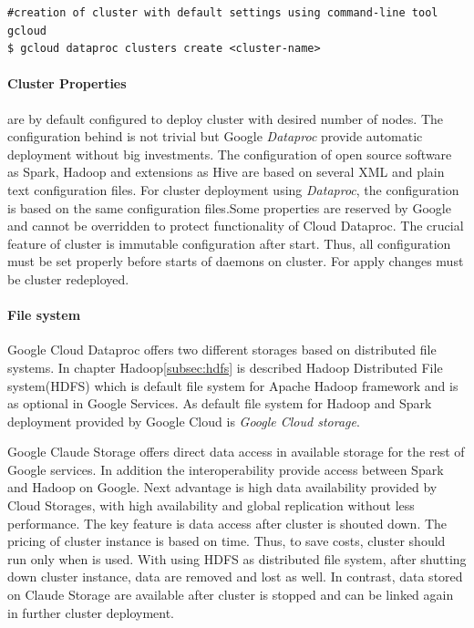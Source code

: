 \documentclass[a4paper,12pt,oneside]{report}
\begin{document}
\begin{footnotesize}\begin{lstlisting}[style=mybash]
#creation of cluster with default settings using command-line tool gcloud
$ gcloud dataproc clusters create <cluster-name>
\end{lstlisting}\end{footnotesize}
 

\paragraph{Cluster Properties} are by default configured to deploy cluster with desired 
number of nodes. The configuration behind is not trivial but Google \textit{Dataproc} provide 
automatic deployment without big investments. The 
configuration of open source software as Spark, Hadoop  and extensions as Hive are based 
on several XML and plain text configuration files. For cluster deployment 
using \textit{Dataproc}, the configuration is based on the same configuration files.Some 
properties are reserved by Google and cannot be overridden 
to protect functionality of Cloud Dataproc. The crucial feature of cluster is immutable 
configuration after start. Thus, all configuration must be set 
properly before starts of daemons on cluster. For apply changes must be cluster redeployed. 

\paragraph{File system}
Google Cloud Dataproc offers two different storages based on distributed file systems. In 
chapter Hadoop\ref{subsec:hdfs} is described Hadoop Distributed File system(HDFS) which is 
default file system for Apache Hadoop framework and is as optional in Google Services. As 
default file system for Hadoop and Spark deployment provided by Google Cloud is \textit{Google Cloud storage}. 

Google Claude Storage offers direct data access in available storage for the rest of Google 
services. In addition the interoperability provide access between Spark and Hadoop on Google. 
Next advantage is high data availability provided by Cloud
 Storages, with high availability and global replication without less performance. The key 
 feature is data access after cluster is shouted down. The 
pricing of cluster instance is based on time. Thus, to save costs, cluster should run only when 
is used. With using HDFS as distributed file system, after 
shutting down cluster instance, data are removed and lost as well. In contrast, data stored on 
Claude Storage are available after cluster is stopped and 
can be linked again in further cluster deployment.
\end{document}
